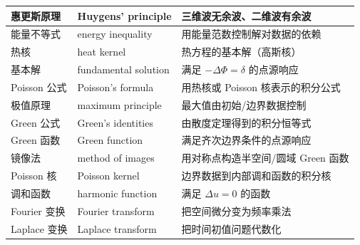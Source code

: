 \documentclass[UTF8,11pt,a4paper]{ctexart}
\begin{document}
\begin{longtable}{@{}>{\raggedright\arraybackslash}p{2.9cm}>{\raggedright\arraybackslash}p{4.7cm}>{\raggedright\arraybackslash}p{7.0cm}@{}}
\hline
惠更斯原理 & Huygens' principle & 三维波无余波、二维波有余波 \\
\hline
能量不等式 & energy inequality & 用能量范数控制解对数据的依赖 \\
\hline
热核 & heat kernel & 热方程的基本解（高斯核） \\
\hline
基本解 & fundamental solution & 满足 $-\Delta\Phi=\delta$ 的点源响应 \\
\hline
Poisson 公式 & Poisson's formula & 用热核或 Poisson 核表示的积分公式 \\
\hline
极值原理 & maximum principle & 最大值由初始/边界数据控制 \\
\hline
Green 公式 & Green's identities & 由散度定理得到的积分恒等式 \\
\hline
Green 函数 & Green function & 满足齐次边界条件的点源响应 \\
\hline
镜像法 & method of images & 用对称点构造半空间/圆域 Green 函数 \\
\hline
Poisson 核 & Poisson kernel & 边界数据到内部调和函数的积分核 \\
\hline
调和函数 & harmonic function & 满足 $\Delta u=0$ 的函数 \\
\hline
Fourier 变换 & Fourier transform & 把空间微分变为频率乘法 \\
\hline
Laplace 变换 & Laplace transform & 把时间初值问题代数化 \\
\hline
\end{longtable}
\normalsize
\end{document}
